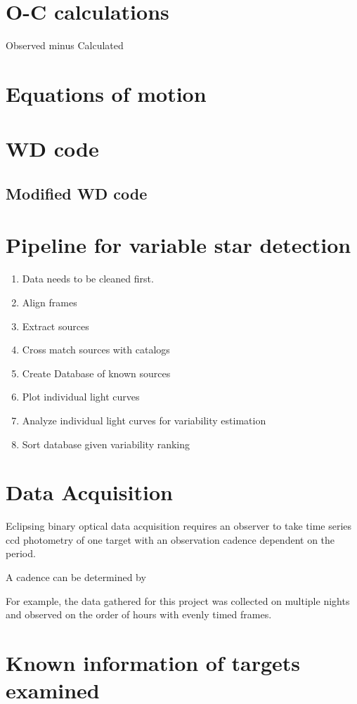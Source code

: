 \section{O-C calculations}
Observed minus Calculated

\section{Equations of motion}

\section{WD code}
\subsection{Modified WD code}

\section{Pipeline for variable star detection}
\begin{enumerate}
    \item Data needs to be cleaned first.
    \item Align frames
    \item Extract sources
    \item Cross match sources with catalogs
    \item Create Database of known sources
    \item Plot individual light curves
    \item Analyze individual light curves for variability estimation
    \item Sort database given variability ranking
\end{enumerate}




\section{Data Acquisition}
Eclipsing binary optical data acquisition requires an observer to take time series ccd photometry of one target with an observation cadence dependent on the period.

A cadence can be determined by 

For example, the data gathered for this project was collected on multiple nights and observed on the order of hours with evenly timed frames.

\section{Known information of targets examined}

